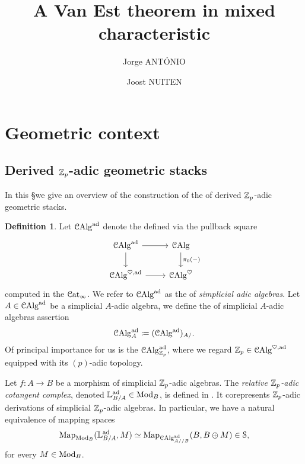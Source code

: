 \documentclass[10pt,a4paper]{amsart}
\author{Jorge ANT\'ONIO}
\author{Joost NUITEN}
\date{}
\title{A Van Est theorem in mixed characteristic}
\numberwithin{equation}{subsection}
\theoremstyle{definition}
\newtheorem{definition}[theorem]{Definition}
\begin{document}
\maketitle


\tableofcontents

\section{Geometric context}

\subsection{Derived $\mathbb Z_p$-adic geometric stacks} In this \S we give an overview of the construction of the \infcat of derived $\mathbb Z_p$-adic geometric stacks.

\begin{definition}
    Let $\mathcal{C}\mathrm{Alg}^{\mathrm{ad}}$ denote the \infcat defined via the pullback square
        \[
        \begin{tikzcd}
            \CAlg^\ad \ar{r} \ar{d} & \CAlg \ar{d}{\pi_0(-)} \\
            \CAlg^{\heartsuit, \ad} \ar{r} & \CAlg^\heartsuit
        \end{tikzcd}
        \]
    computed in the \infcat $\mathcal{C}\mathrm{at}_\infty$. We refer to $\mathcal{C}\mathrm{Alg}^{\mathrm{ad}}$ as the \infcat of \emph{simplicial adic algebras}. Let $A \in \mathcal{C}\mathrm{Alg}^{\mathrm{ad}}$ be a simplicial $A$-adic algebra, we define the \infcat of simplicial $A$-adic algebras assertion
        \[
                \mathcal{C}\mathrm{Alg}^{\mathrm{ad}}_{A} \coloneqq (\mathcal{C}\mathrm{Alg}^{\mathrm{ad}})_{A/}  .
        \]
    Of principal importance for us is the \infcat $\mathcal C \mathrm{Alg}^{\mathrm{ad}}_{\mathbb Z_p}$, where we regard $\mathbb Z_p \in \mathcal{C}\mathrm{Alg}^{\heartsuit, \mathrm{ad}}$ equipped with its $(p)$-adic topology.
\end{definition}

Let $f \colon A \to B$ be a morphism of simplicial $\mathbb Z_p$-adic algebras. The \emph{relative $\mathbb Z_p$-adic cotangent complex}, denoted $\mathbb{L}^{\mathrm{ad}}_{B/A} \in \mathrm{Mod}_B$, is defined in \cite[\S 3.4]{antonio2018p}. It corepresents $\mathbb Z_p$-adic derivations of simplicial $\mathbb Z_p$-adic algebras.
In particular, we have a natural equivalence of mapping spaces 
    \[
            \mathrm{Map}_{\mathrm{Mod}_B}(\mathbb{L}^{\mathrm{ad}}_{B/A}, M) \simeq \mathrm{Map}_{\mathcal{C}\mathrm{Alg}^{\mathrm{ad}}_{A/ / B}}(B , B \oplus M) \in \mathcal S,
    \]  
for every $M \in \mathrm{Mod}_B$.
\end{document}
